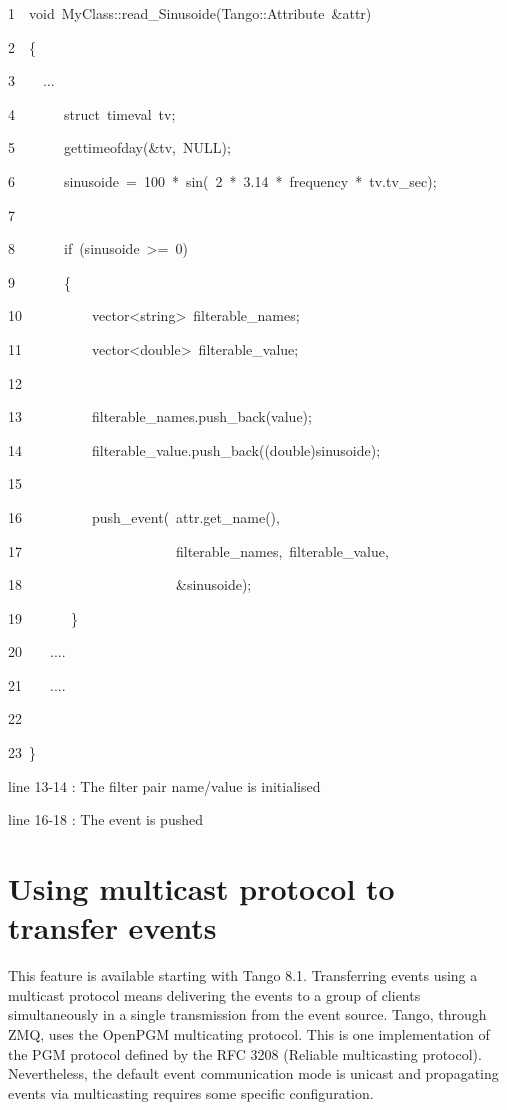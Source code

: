 
\begin{lyxcode}
1~~void~MyClass::read\_Sinusoide(Tango::Attribute~\&attr)

2~~\{

3~~~~...

4~~~~~~~struct~timeval~tv;

5~~~~~~~gettimeofday(\&tv,~NULL);

6~~~~~~~sinusoide~=~100~{*}~sin(~2~{*}~3.14~{*}~frequency~{*}~tv.tv\_sec);

7~~

8~~~~~~~if~(sinusoide~>=~0)~

9~~~~~~~\{

10~~~~~~~~~~vector<string>~filterable\_names;

11~~~~~~~~~~vector<double>~filterable\_value;

12~

13~~~~~~~~~~filterable\_names.push\_back(\textquotedbl{}value\textquotedbl{});

14~~~~~~~~~~filterable\_value.push\_back((double)sinusoide);

15~

16~~~~~~~~~~push\_event(~attr.get\_name(),

17~~~~~~~~~~~~~~~~~~~~~~filterable\_names,~filterable\_value,

18~~~~~~~~~~~~~~~~~~~~~~\&sinusoide);

19~~~~~~~\}

20~~~~....

21~~~~....

22~

23~\}
\end{lyxcode}


line 13-14 : The filter pair name/value is initialised

line 16-18 : The event is pushed

\section{Using multicast protocol to transfer events}

This feature is available starting with Tango 8.1. Transferring events
using a multicast protocol means delivering the
events to a group of clients simultaneously in a single transmission
from the event source. Tango, through ZMQ, uses the OpenPGM multicating
protocol. This is one implementation of the PGM protocol defined by
the RFC 3208 (Reliable multicasting protocol). Nevertheless, the default
event communication mode is unicast and propagating events via multicasting
requires some specific configuration.

